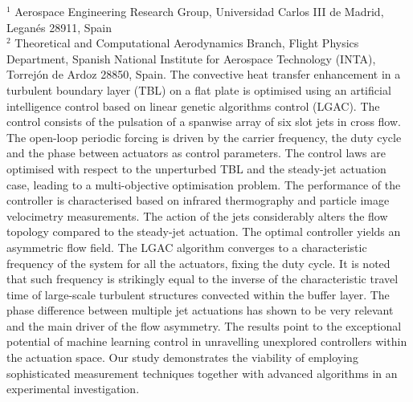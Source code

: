 %
%
%
%
%
%
%
\paperaffiliation
{%
  $^1$ Aerospace Engineering Research Group, Universidad Carlos III de Madrid, Legan\'{e}s 28911, Spain\\%
  $^2$ Theoretical and Computational Aerodynamics Branch, Flight Physics Department, Spanish National Institute for Aerospace Technology (INTA), Torrej\'on de Ardoz 28850, Spain.
}%
%
%
%
%
%
%
%
%
%
\papersummary%
{%
The convective heat transfer enhancement in a turbulent boundary layer (TBL) on a flat plate is optimised using an artificial intelligence control based on linear genetic algorithms control (LGAC). The control consists of the pulsation of a spanwise array of six slot jets in cross flow. The open-loop periodic forcing is driven by the carrier frequency, the duty cycle and the phase between actuators as control parameters. The control laws are optimised with respect to the unperturbed TBL and the steady-jet actuation case, leading to a multi-objective optimisation problem. The performance of the controller is characterised based on infrared thermography and particle image velocimetry measurements. The action of the jets considerably alters the flow topology compared to the steady-jet actuation. The optimal controller yields an asymmetric flow field. The LGAC algorithm converges to a characteristic frequency of the system for all the actuators, fixing the duty cycle. It is noted that such frequency is strikingly equal to the inverse of the characteristic travel time of large-scale turbulent structures convected within the buffer layer. The phase difference between multiple jet actuations has shown to be very relevant and the main driver of the flow asymmetry. The results point to the exceptional potential of machine learning control in unravelling unexplored controllers within the actuation space. Our study demonstrates the viability of employing sophisticated measurement techniques together with advanced algorithms in an experimental investigation.
}
